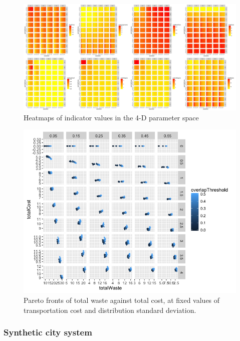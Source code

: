 \documentclass[fleqn,10pt]{wlscirep}
\begin{document}
{%
\begin{figure}
\hspace{-2cm}\includegraphics[width=1.3\textwidth]{figures/heatmap_indics}
\caption{Heatmaps of indicator values in the 4-D parameter space}
\label{fig:heatmap}
\end{figure}

\begin{figure}
\hspace{-2cm}\includegraphics[width=1.3\textwidth]{figures/pareto_wasteCost_overlapThreshold}
\caption{Pareto fronts of total waste against total cost, at fixed values of transportation cost and distribution standard deviation.}
\label{fig:pareto}
\end{figure}



\subsubsection{Synthetic city system}

}
\end{document}
